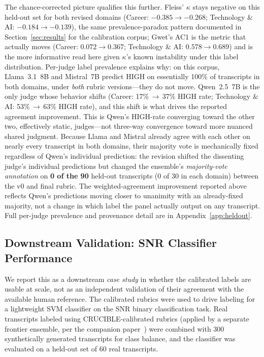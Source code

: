 \documentclass[11pt]{article}
\begin{document}
The chance-corrected picture qualifies this further. Fleiss' $\kappa$ stays
negative on this held-out set for both revised domains (Career:
$-0.385\to-0.268$; Technology \& AI: $-0.184\to-0.139$), the same
prevalence-paradox pattern documented in Section~\ref{sec:results} for the
calibration corpus; Gwet's AC1 is the metric that actually moves (Career:
$0.072\to0.367$; Technology \& AI: $0.578\to0.689$) and is the more
informative read here given $\kappa$'s known instability under this label
distribution. Per-judge label prevalence explains why: on this corpus,
Llama~3.1~8B and Mistral~7B predict HIGH on essentially 100\% of
transcripts in both domains, under \emph{both} rubric versions---they do
not move. Qwen~2.5~7B is the only judge whose behavior shifts (Career:
17\%\,$\to$\,37\% HIGH rate; Technology \& AI: 53\%\,$\to$\,63\% HIGH
rate), and this shift is what drives the reported agreement improvement.
This is Qwen's HIGH-rate converging toward the other two, effectively
static, judges---not three-way convergence toward more nuanced shared
judgment. Because Llama and Mistral already agree with each other on
nearly every transcript in both domains, their majority vote is
mechanically fixed regardless of Qwen's individual prediction: the
revision shifted the dissenting judge's individual predictions but changed
the ensemble's \emph{majority-vote annotation} on \textbf{0 of the 90}
held-out transcripts (0 of 30 in each domain) between the v0 and final
rubric. The weighted-agreement improvement reported above reflects Qwen's
predictions moving closer to unanimity with an already-fixed majority, not
a change in which label the panel actually output on any transcript. Full
per-judge prevalence and provenance detail are in Appendix~\ref{app:heldout}.

\subsection{Downstream Validation: SNR Classifier Performance}

We report this as a downstream \emph{case study} in whether the calibrated
labels are usable at scale, not as an independent validation of their
agreement with the available human reference. The calibrated rubrics were
used to drive labeling for a
lightweight SVM classifier on the SNR binary classification task. Real
transcripts labeled using CRUCIBLE-calibrated rubrics (applied by a separate
frontier ensemble, per the companion paper~\cite{dasSNR2026}) were combined
with 300 synthetically generated transcripts for class balance, and the
classifier was evaluated on a held-out set of 60 real transcripts.
\end{document}
